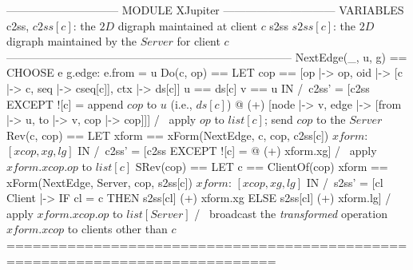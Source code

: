 \documentclass[preview, border={5pt 0pt 15pt 1pt}]{standalone}
\begin{document}
\begin{tla}
------------------------------ MODULE XJupiter ------------------------------
VARIABLES c2ss, \* $c2ss[c]$: the $2D$ digraph maintained at client $c$ 
          s2ss  \* $s2ss[c]$: the $2D$ digraph maintained by the $Server$ for client $c$
-----------------------------------------------------------------------------
NextEdge(_, u, g) == CHOOSE e \in g.edge: e.from = u
Do(c, op) == LET cop == [op |-> op, oid |-> [c |-> c, seq |-> cseq[c]], ctx |-> ds[c]]
                   u == ds[c]    v == u 
             IN  /\ c2ss' = [c2ss EXCEPT ![c] = \* append $cop$ to $u$ (i.e., $ds[c]$)
                    @ (+) [node |-> {v}, edge |-> {[from |-> u, to |-> v, cop |-> cop]}]]
                 /\ \* apply $op$ to $list[c]$; send $cop$ to the $Server$
Rev(c, cop) == LET xform == xForm(NextEdge, c, cop, c2ss[c]) \* $xform$: $[xcop, xg, lg]$
               IN  /\ c2ss' = [c2ss EXCEPT ![c] = @ (+) xform.xg]
                   /\ \* apply $xform.xcop.op$ to $list[c]$
SRev(cop) == 
    LET c == ClientOf(cop)
    xform == xForm(NextEdge, Server, cop, s2ss[c]) \* $xform$: $[xcop, xg, lg]$
    IN  /\ s2ss' = [cl \in Client |-> IF cl = c THEN s2ss[cl] (+) xform.xg
                                                ELSE s2ss[cl] (+) xform.lg]
        /\ \* apply $xform.xcop.op$ to $list[Server]$
        /\ \* broadcast the \emph{transformed} operation $xform.xcop$ to clients other than $c$
=============================================================================
\end{tla}
\end{document}
